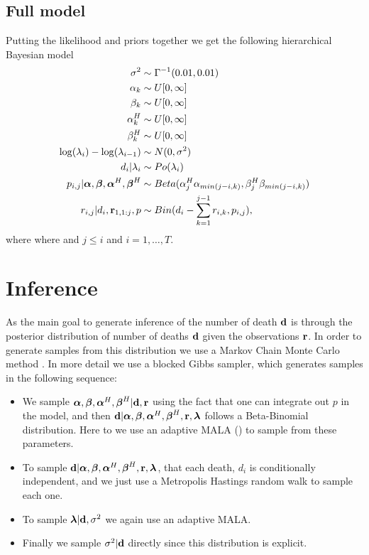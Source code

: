 \subsection{Full model}
Putting the likelihood and priors together we get the following hierarchical Bayesian model
\begin{align*}
\sigma^2 &\sim \Gamma^{-1}(0.01,0.01) \\
\alpha_k &\sim U[0,\infty] \\
\beta_k &\sim U[0,\infty] \\
\alpha_k^H &\sim U[0,\infty] \\
\beta_k^H &\sim U[0,\infty] \\
\log(\lambda_i) - \log(\lambda_{i-1}) &\sim N(0,\sigma^2)\\
d_i| \lambda_i  &\sim Po(\lambda_i) \\
p_{i,j}|  {\boldsymbol{\mathrm{\alpha}}},{\boldsymbol{\mathrm{\beta}}}, {\boldsymbol{\mathrm{\alpha}}}^H,{\boldsymbol{\mathrm{\beta}}}^H &\sim Beta(\alpha^H_j\alpha_{min(j-i,k)},\beta^H_j\beta_{min(j-i,k)}) \\
r_{i,j}|d_i,{\boldsymbol{\mathrm{r}}}_{1,1:j},p &\sim Bin(d_i - \sum_{k=1}^{j-1}r_{i,k}, p_{i,j}),
\end{align*}
where where and $j\leq i$ and $i=1,\ldots,T$.

\section{Inference}
As the main goal to generate inference of the number of death ${\boldsymbol{\mathrm{d}}}$ is through the posterior distribution of number of deaths ${\boldsymbol{\mathrm{d}}}$ given the observations ${\boldsymbol{\mathrm{r}}}$.
In order to generate samples from this distribution we use a Markov Chain Monte Carlo method \cite{Brooks2011_handbook_markov}. In more detail we use a blocked Gibbs sampler, which generates samples in the following sequence:
\begin{itemize}
	\item  We sample ${\boldsymbol{\mathrm{\alpha}}},{\boldsymbol{\mathrm{\beta}}}, {\boldsymbol{\mathrm{\alpha}}}^H,{\boldsymbol{\mathrm{\beta}}}^H|{\boldsymbol{\mathrm{d}}}, {\boldsymbol{\mathrm{r}}}$ using the fact that one can integrate out $p$ in the model, and then  ${\boldsymbol{\mathrm{d}}}|{\boldsymbol{\mathrm{\alpha}}},{\boldsymbol{\mathrm{\beta}}}, {\boldsymbol{\mathrm{\alpha}}}^H,{\boldsymbol{\mathrm{\beta}}}^H,{\boldsymbol{\mathrm{r}}},{\boldsymbol{\mathrm{\lambda}}}$  follows a Beta-Binomial distribution. Here to we use an adaptive MALA (\cite{Atchade2006_adaptive_version}) to sample from these parameters.
	\item  To sample ${\boldsymbol{\mathrm{d}}}|{\boldsymbol{\mathrm{\alpha}}},{\boldsymbol{\mathrm{\beta}}}, {\boldsymbol{\mathrm{\alpha}}}^H,{\boldsymbol{\mathrm{\beta}}}^H,{\boldsymbol{\mathrm{r}}},{\boldsymbol{\mathrm{\lambda}}}$, that each death, $d_i$ is conditionally independent, and we just use a Metropolis Hastings random walk to sample each one.
	\item To sample ${\boldsymbol{\mathrm{\lambda}}} | {\boldsymbol{\mathrm{d}}},\sigma^2$ we again use an adaptive MALA.
	\item Finally we sample $\sigma^2|{\boldsymbol{\mathrm{d}}}$ directly since this distribution is explicit.
\end{itemize}


